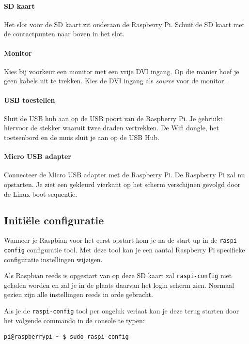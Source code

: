 \documentclass[a4paper]{article}
\begin{document}
      \paragraph{SD kaart} Het slot voor de SD kaart zit onderaan de
Raspberry Pi.  Schuif de SD kaart met de contactpunten naar boven in
het slot.

      \paragraph{Monitor} Kies bij voorkeur een monitor met een vrije
DVI ingang.  Op die manier hoef je geen kabels uit te trekken.  Kies
de DVI ingang als \emph{source} voor de monitor.

      \paragraph{USB toestellen} Sluit de USB hub aan op de USB poort
van de Raspberry Pi.  Je gebruikt hiervoor de stekker waaruit twee
draden vertrekken.  De Wifi dongle, het toetsenbord en de muis sluit
je aan op de USB Hub.

      \paragraph{Micro USB adapter} Connecteer de Micro USB adapter
met de Raspberry Pi.  De Raspberry Pi zal nu opstarten.  Je ziet een
gekleurd vierkant op het scherm verschijnen gevolgd door de Linux boot
sequentie.

    \subsection{Initi\"ele configuratie}

      Wanneer je Raspbian voor het eerst opstart kom je na de start up
in de \texttt{raspi-config} configuratie tool.  Met deze tool kan je
een aantal Raspberry Pi specifieke configuratie instellingen wijzigen.

      Als Raspbian reeds is opgestart van op deze SD kaart zal
\texttt{raspi-config} niet geladen worden en zal je in de plaats
daarvan het login scherm zien.  Normaal gezien zijn alle instellingen
reeds in orde gebracht. 

      Als je de \texttt{raspi-config} tool per ongeluk verlaat kan je
deze terug starten door het volgende commando in de console te typen:

\begin{lstlisting}
pi@raspberrypi ~ $ sudo raspi-config
\end{lstlisting}
\end{document}
